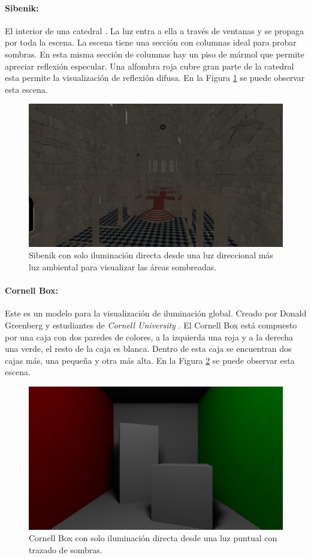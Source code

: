 \paragraph{Sibenik:} El interior de una catedral \cite{sibenik_model}. La luz entra a ella a través de ventanas y se propaga por toda la escena. La escena tiene una sección con columnas ideal para probar sombras. En esta misma sección de columnas hay un piso de mármol que permite apreciar reflexión especular. Una alfombra roja cubre gran parte de la catedral esta permite la visualización de reflexión difusa. En la Figura \ref{fig:sibenik} se puede observar esta escena.

\begin{figure}[H]
	\centering
	\includegraphics[width=0.65\linewidth]{media/scenes/sibenik.png}
	\caption{Sibenik con solo iluminación directa desde una luz direccional más luz ambiental para visualizar las áreas sombreadas.}
	\label{fig:sibenik}
\end{figure}

\paragraph{Cornell Box:} Este es un modelo para la visualización de iluminación global. Creado por Donald Greenberg y estudiantes de \emph{Cornell University} \cite{cornell_model}. El Cornell Box está compuesto por una caja con dos paredes de colores, a la izquierda una roja y a la derecha una verde, el resto de la caja es blanca. Dentro de esta caja se encuentran dos cajas más, una pequeña y otra más alta. En la Figura \ref{fig:cornell} se puede observar esta escena.

\begin{figure}[H]
	\centering
	\includegraphics[width=0.65\linewidth]{media/scenes/cornell.png}
	\caption{Cornell Box con solo iluminación directa desde una luz puntual con trazado de sombras.}
	\label{fig:cornell}
\end{figure}

